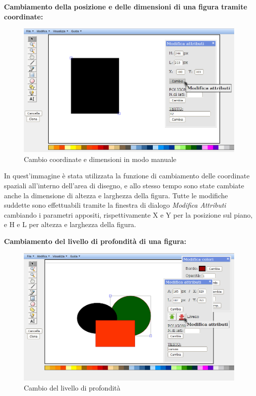 \textbf{Cambiamento della posizione e delle dimensioni di una figura tramite coordinate:}\\
\begin{figure}[!ht]
\centering
\includegraphics[scale=0.4]{images/dim_pos.png}
\caption{Cambio coordinate e dimensioni in modo manuale}
\end{figure}
 
 
\vspace{50pt}
In quest'immagine \` e stata utilizzata la funzione di cambiamento delle coordinate spaziali all'interno dell'area di disegno, e allo stesso tempo sono state cambiate anche la dimensione di altezza e larghezza della figura. Tutte le modifiche suddette sono effettuabili tramite la finestra di dialogo \textit{Modifica Attributi} cambiando i parametri appositi, rispettivamente X e Y per la posizione sul piano, e H e L per altezza e larghezza della figura.
\newpage

\textbf{Cambiamento del livello di profondit\`a di una figura:}\\
\begin{figure}[!ht]
\centering
\includegraphics[scale=0.4]{images/livello.png}
\caption{Cambio del livello di profondit\` a}
\end{figure}
 
